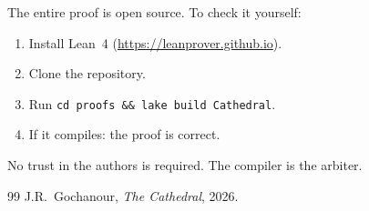 \documentclass[11pt,a4paper]{article}
\begin{document}
The entire proof is open source. To check it yourself:

\begin{enumerate}
  \item Install Lean~4 (\url{https://leanprover.github.io}).
  \item Clone the repository.
  \item Run \texttt{cd proofs \&\& lake build Cathedral}.
  \item If it compiles: the proof is correct.
\end{enumerate}

No trust in the authors is required. The compiler is the arbiter.

\begin{thebibliography}{99}
J.R.~Gochanour, \emph{The Cathedral}, 2026.
\end{thebibliography}
\end{document}
